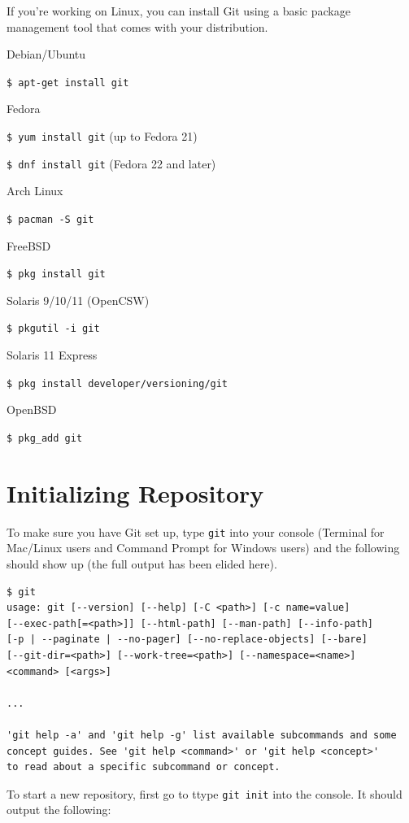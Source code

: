 \documentclass{amsart}
\begin{document}
If you're working on Linux, you can install Git using a basic package management tool that comes with your distribution.

Debian/Ubuntu

\verb|$ apt-get install git|

\bigskip

Fedora

\verb|$ yum install git| (up to Fedora 21)

\verb|$ dnf install git| (Fedora 22 and later)

\bigskip

Arch Linux

\verb|$ pacman -S git|

\bigskip

FreeBSD

\verb|$ pkg install git|

\bigskip

Solaris 9/10/11 (OpenCSW)

\verb|$ pkgutil -i git|

\bigskip

Solaris 11 Express

\verb|$ pkg install developer/versioning/git|

\bigskip

OpenBSD

\verb|$ pkg_add git|


\newpage

\section*{Initializing Repository}

To make sure you have Git set up, type \verb|git| into your console (Terminal for Mac/Linux users and Command Prompt for Windows users) and the following should show up (the full output has been elided here).

\begin{verbatim}
$ git
usage: git [--version] [--help] [-C <path>] [-c name=value]
[--exec-path[=<path>]] [--html-path] [--man-path] [--info-path]
[-p | --paginate | --no-pager] [--no-replace-objects] [--bare]
[--git-dir=<path>] [--work-tree=<path>] [--namespace=<name>]
<command> [<args>]

...

'git help -a' and 'git help -g' list available subcommands and some
concept guides. See 'git help <command>' or 'git help <concept>'
to read about a specific subcommand or concept.
\end{verbatim}
\bigskip
\noindent
To start a new repository, first go to ttype \verb|git init| into the console. It should output the following:
\end{document}
